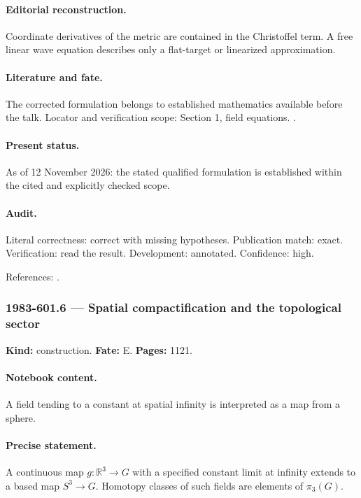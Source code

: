 \paragraph{Editorial reconstruction.} Coordinate derivatives of the metric are contained in the Christoffel term. A free linear wave equation describes only a flat-target or linearized approximation.

\paragraph{Literature and fate.} The corrected formulation belongs to established mathematics available before the talk. Locator and verification scope: Section 1, field equations. \cite{perelomov1981instantons}.

\paragraph{Present status.} As of 12 November 2026: the stated qualified formulation is established within the cited and explicitly checked scope.

\paragraph{Audit.} Literal correctness: correct with missing hypotheses. Publication match: exact. Verification: read the result. Development: annotated. Confidence: high.

\noindent References: \citep{perelomov1981instantons}.\par

\subsubsection{1983-601.6 --- Spatial compactification and the topological sector}

\label{item:1983-601.6}

\noindent\textbf{Kind:} construction. \textbf{Fate:} E. \textbf{Pages:} 1121.\par

\paragraph{Notebook content.} A field tending to a constant at spatial infinity is interpreted as a map from a sphere.

\paragraph{Precise statement.} A continuous map \(g:\mathbb R^3\to G\) with a specified constant limit at infinity extends to a based map \(S^3\to G\). Homotopy classes of such fields are elements of \(\pi_3(G)\).

